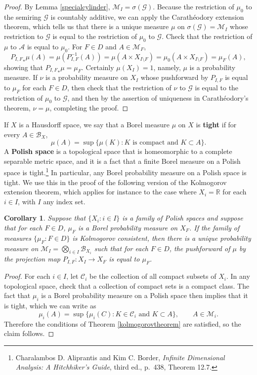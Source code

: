 \documentclass{article}
\newtheorem{corollary}[theorem]{Corollary}
\theoremstyle{definition}
\begin{document}
\begin{proof}
By Lemma \ref{specialcylinder},
$\mathscr{M}_I = \sigma(\mathscr{G})$.
Because the restriction of $\mu_0$ to the semiring $\mathscr{G}$ is countably additive, we can
apply the Carath\'eodory extension theorem, which tells us that there is a unique measure $\mu$
on $\sigma(\mathscr{G})=\mathscr{M}_I$ whose restriction to $\mathscr{G}$ is equal to the restriction of $\mu_0$ to $\mathscr{G}$. Check that the restriction
of $\mu$ to $\mathscr{A}$ is equal to $\mu_0$. For $F \in D$ and $A \in \mathscr{M}_F$, 
\[
{P_{I,F}}_* \mu (A) = \mu(P_{I,F}^{-1}(A)) = \mu(A \times X_{I \setminus F}) = \mu_0(A \times X_{I \setminus F}) = \mu_F(A),
\]
showing that ${P_{I,F}}_* \mu = \mu_F$. Certainly $\mu(X_I)=1$, namely, $\mu$ is a probability measure. 
If $\nu$ is a probability measure on $X_I$ whose pushforward by $P_{I,F}$ is equal to $\mu_F$ for each $F \in D$, then
check that the restriction of $\nu$ to $\mathscr{G}$ is equal to the restriction of $\mu_0$ to $\mathscr{G}$, and then
by the assertion of uniqueness in Carath\'eodory's theorem, $\nu=\mu$, completing the proof.
\end{proof}

If $X$ is a Hausdorff space, we say that a Borel measure $\mu$ on $X$ is \textbf{tight} if for every $A \in \mathscr{B}_X$,
\[
\mu(A) = \sup\{\mu(K): \textrm{$K$ is compact and $K \subset A$}\}.
\]
A \textbf{Polish space} is a topological space that is homeomorphic to a complete separable metric space, and 
it is a fact that a finite Borel measure on a Polish space is tight.\footnote{Charalambos D. 
Aliprantis and Kim C. Border, {\em Infinite Dimensional Analysis: A Hitchhiker's Guide}, third ed., p.~438,
Theorem 12.7.} In particular, any Borel probability measure on a Polish space is tight. We use this  in the proof
of the following version of the Kolmogorov extension theorem, which  applies for instance to the case
where $X_i=\mathbb{R}$ for each $i \in I$, with $I$ any index set. 


\begin{corollary}
Suppose that $\{X_i: i \in I\}$ is a family of Polish spaces and suppose that for each $F \in D$, $\mu_F$ is a Borel probability
measure on $X_F$. If the family of measures $\{\mu_F: F \in D\}$ is Kolmogorov consistent, then there is a unique probability
measure on $\mathscr{M}_I=\bigotimes_{i \in I} \mathscr{B}_{X_i}$ such that for each $F \in D$, the pushforward of $\mu$ by the projection map $P_{I,F}:X_I \to X_F$ is
equal to $\mu_F$. 
\end{corollary}
\begin{proof}
For each $i \in I$, let $\mathscr{C}_i$ be the collection of all compact subsets of $X_i$. In any topological space, check that
a collection
of compact sets is a compact class. The fact that $\mu_i$ is a Borel probability measure on a Polish
space then implies that it is tight, which we can write as
\[
\mu_i(A) = \sup\{\mu_i(C): \textrm{$K \in \mathscr{C}_i$ and $K \subset A$}\}, \qquad A \in \mathscr{M}_i.
\]
Therefore the conditions of Theorem \ref{kolmogorovtheorem} are satisfied, so the claim follows.
\end{proof}
\end{document}
